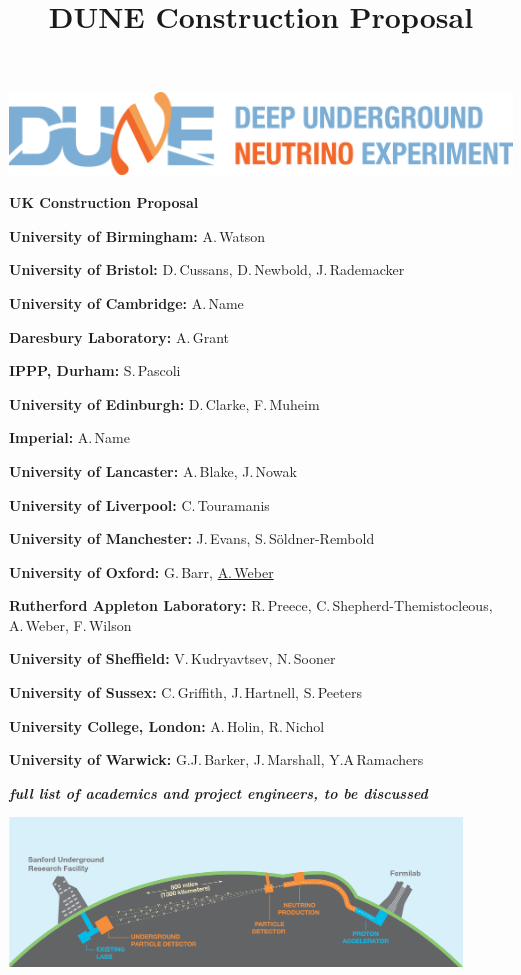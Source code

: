 \documentclass[a4paper,11pt]{article}
\begin{document}
\setcounter{page}{0}

\title{DUNE Construction Proposal}

\begin{center}

\includegraphics[width=\textwidth]{figs/dune-horiz-logo-lg.png}
\vspace{1ex}

{\LARGE\bf 
UK Construction Proposal
}
\vfill

{\bf University of Birmingham:} A.\,Watson

{\bf University of Bristol:} D.\,Cussans, D.\,Newbold, J.\,Rademacker

{\bf University of Cambridge:} A.\,Name

{\bf Daresbury Laboratory:} A.\,Grant

{\bf IPPP, Durham:} S.\,Pascoli

{\bf University of Edinburgh:} D.\,Clarke, F.\,Muheim

{\bf Imperial:} A.\,Name

{\bf University of Lancaster:} A.\,Blake, J.\,Nowak

{\bf University of Liverpool:} C.\,Touramanis

{\bf University of Manchester:} J.\,Evans, S.\,S\"oldner-Rembold

{\bf University of Oxford:} G.\,Barr, \underline{A.\,Weber}

{\bf Rutherford Appleton Laboratory:} R.\,Preece, C.\,Shepherd-Themistocleous, A.\,Weber, F.\,Wilson

{\bf University of Sheffield:} V.\,Kudryavtsev, N.\,Sooner

{\bf University of Sussex:} C.\,Griffith, J.\,Hartnell, S.\,Peeters

{\bf University College, London:} A.\,Holin, R.\,Nichol

{\bf University of Warwick:} G.J.\,Barker, J.\,Marshall, Y.A\,Ramachers

{\bf\it full list of academics and project engineers, to be discussed }
\vfill

\includegraphics[width=0.9\textwidth]{figs/LBNE_Graphic_061615_2016.jpg}
\end{center}
\vfill
\end{document}
